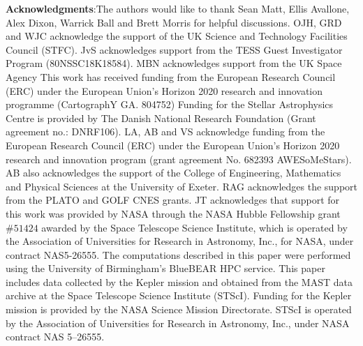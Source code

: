 \documentclass[12pt]{article}
\begin{document}

\textbf{Acknowledgments}:The authors would like to thank Sean Matt, Ellis Avallone, Alex Dixon, Warrick Ball and Brett Morris for helpful discussions. 
OJH, GRD and WJC acknowledge the support of the UK Science and Technology Facilities Council (STFC). 
JvS acknowledges support from the TESS Guest Investigator Program (80NSSC18K18584).
MBN acknowledges support from the UK Space Agency
This work has received funding from the European Research Council (ERC) under the European Union's Horizon 2020 research and innovation programme (CartographY GA. 804752)
Funding for the Stellar Astrophysics Centre is provided by The Danish National Research Foundation (Grant agreement no.: DNRF106). 
LA, AB and VS acknowledge funding from the European Research Council (ERC) under the European Union's Horizon 2020 research and innovation program (grant agreement No. 682393 AWESoMeStars). AB also acknowledges the support of the College of Engineering, Mathematics and Physical Sciences at the University of Exeter.
RAG acknowledges the support from the PLATO and GOLF CNES grants.
JT acknowledges that support for this work was provided by NASA through the NASA Hubble Fellowship grant $\#51424$ awarded by the Space Telescope Science Institute, which is operated by the Association of Universities for Research in Astronomy, Inc., for NASA, under contract NAS5-26555.
The computations described in this paper were performed using the University of Birmingham's BlueBEAR HPC service.
This paper includes data collected by the Kepler mission and obtained from the MAST data archive at the Space Telescope Science Institute (STScI). Funding for the Kepler mission is provided by the NASA Science Mission Directorate. STScI is operated by the Association of Universities for Research in Astronomy, Inc., under NASA contract NAS 5–26555.\\
\end{document}

